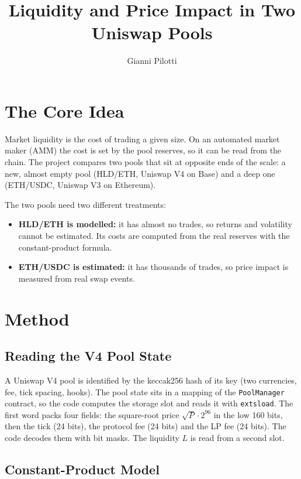 \documentclass[11pt,a4paper]{article}
\title{Liquidity and Price Impact in Two Uniswap Pools}
\author{Gianni Pilotti}
\date{}
\begin{document}
\maketitle

\section{The Core Idea}

Market liquidity is the cost of trading a given size. On an automated market maker (AMM) the cost is set by the pool reserves, so it can be read from the chain. The project compares two pools that sit at opposite ends of the scale: a new, almost empty pool (HLD/ETH, Uniswap V4 on Base) and a deep one (ETH/USDC, Uniswap V3 on Ethereum).

The two pools need two different treatments:

\begin{itemize}
\item \textbf{HLD/ETH is modelled:} it has almost no trades, so returns and volatility cannot be estimated. Its costs are computed from the real reserves with the constant-product formula.
\item \textbf{ETH/USDC is estimated:} it has thousands of trades, so price impact is measured from real swap events.
\end{itemize}

\section{Method}

\subsection{Reading the V4 Pool State}

A Uniswap V4 pool is identified by the keccak256 hash of its key (two currencies, fee, tick spacing, hooks). The pool state sits in a mapping of the \texttt{PoolManager} contract, so the code computes the storage slot and reads it with \texttt{extsload}. The first word packs four fields: the square-root price $\sqrt P\cdot2^{96}$ in the low 160 bits, then the tick (24 bits), the protocol fee (24 bits) and the LP fee (24 bits). The code decodes them with bit masks. The liquidity $L$ is read from a second slot.

\subsection{Constant-Product Model}
\end{document}
